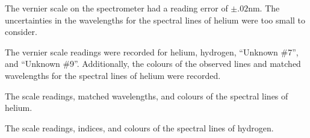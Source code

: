 \begin{paper}
The vernier scale on the spectrometer had a reading error of
$\pm.02\si{\nano\meter}$.
The uncertainties in the wavelengths for the spectral lines of helium were
too small to consider.

The vernier scale readings were recorded for helium, hydrogen, ``Unknown \#7'',
and ``Unknown \#9''.
Additionally, the colours of the observed lines and matched wavelengths for the
spectral lines of helium were recorded.\pagebreak

{The scale readings, matched wavelengths, and colours of the spectral lines of helium.}

{The scale readings, indices, and colours of the spectral lines of hydrogen.}


\end{paper}
